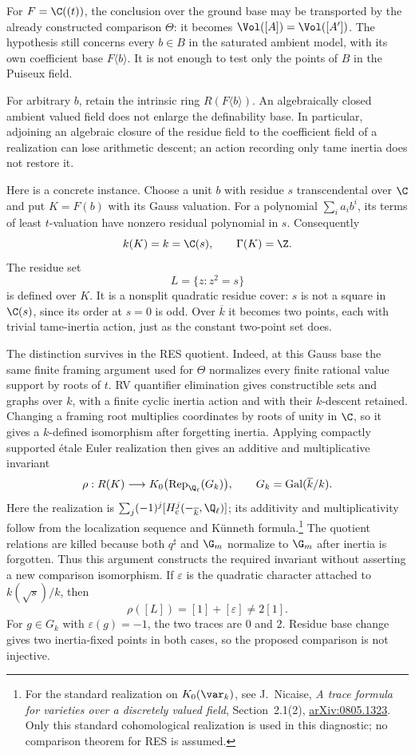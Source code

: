 For $F=\C((t))$, the conclusion over the ground base may be
transported by the already constructed comparison $\Theta$:
it becomes $\Vol([A])=\Vol([A'])$.
The hypothesis still concerns every $b\in B$ in the
saturated ambient model, with its own coefficient base
$F\langle b\rangle$.
It is not enough to test only the points of $B$ in the
Puiseux field.

For arbitrary $b$, retain the intrinsic ring
$R(F\langle b\rangle)$.
An algebraically closed ambient valued field does not enlarge
the definability base.
In particular, adjoining an algebraic closure of the residue
field to the coefficient field of a realization can lose
arithmetic descent; an action recording only tame inertia
does not restore it.

Here is a concrete instance.
Choose a unit $b$ with residue $s$ transcendental over $\C$
and put $K=F(b)$ with its Gauss valuation.
For a polynomial $\sum_i a_i b^i$, its terms of least
$t$-valuation have nonzero residual polynomial in $s$.
Consequently
\[
 k(K)=k=\C(s),\qquad \Gamma(K)=\Z.
\]
The residue set
\[
 L=\{z:z^2=s\}
\]
is defined over $K$.
It is a nonsplit quadratic residue cover: $s$ is not a square
in $\C(s)$, since its order at $s=0$ is odd.
Over $\overline{k}$ it becomes two points, each with trivial
tame-inertia action, just as the constant two-point set does.

The distinction survives in the RES quotient.
Indeed, at this Gauss base the same finite framing argument
used for $\Theta$ normalizes every finite rational value
support by roots of $t$.
RV quantifier elimination gives constructible sets and graphs
over $k$, with a finite cyclic inertia action and with their
$k$-descent retained.
Changing a framing root multiplies coordinates by roots of
unity in $\C$, so it gives a $k$-defined isomorphism after
forgetting inertia.
Applying compactly supported \'etale Euler realization then
gives an additive and multiplicative invariant
\[
 \rho:R(K)\longrightarrow
 K_0\bigl(\operatorname{Rep}_{\Q_\ell}(G_k)\bigr),
 \qquad G_k=\operatorname{Gal}(\overline{k}/k).
\]
Here the realization is
$\sum_j(-1)^j[H_c^j(-_{\overline{k}},\Q_\ell)]$;
its additivity and multiplicativity follow from the
localization sequence and K\"unneth formula.\footnote{For
the standard realization on $K_0(\var_k)$, see
J.~Nicaise, \emph{A trace formula for varieties over a
discretely valued field}, Section~2.1(2),
\href{https://arxiv.org/pdf/0805.1323}{arXiv:0805.1323}.
Only this standard cohomological realization is used in this
diagnostic; no comparison theorem for RES is assumed.}
The quotient relations are killed because both
$q^\sharp$ and $\G_m$ normalize to $\G_m$ after inertia is
forgotten. Thus this argument constructs the required
invariant without asserting a new comparison isomorphism.
If $\varepsilon$ is the quadratic character attached to
$k(\sqrt{s})/k$, then
\[
 \rho([L])=[1]+[\varepsilon]\ne 2[1].
\]
For $g\in G_k$ with $\varepsilon(g)=-1$, the two traces
are $0$ and $2$. Residue base change gives two inertia-fixed
points in both cases, so the proposed comparison is not
injective.

